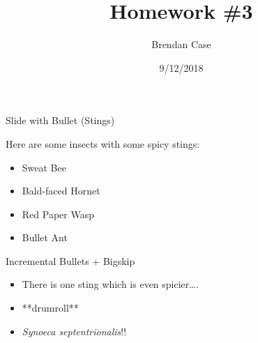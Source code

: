 \documentclass[ignorenonframetext,]{beamer}
\title{Homework \#3}
\author{Brendan Case}
\date{9/12/2018}
\providecommand{\tightlist}{%
  \setlength{\itemsep}{0pt}\setlength{\parskip}{0pt}}
\begin{document}
\frame{\titlepage}

\begin{frame}{Slide with Bullet (Stings)}
\protect\hypertarget{slide-with-bullet-stings}{}

Here are some insects with some spicy stings:

\begin{itemize}
\tightlist
\item
  \color{blue} Sweat Bee
\item
  \color{yellow} Bald-faced Hornet
\item
  \color{orange} Red Paper Wasp
\item
  \color{red} Bullet Ant
\end{itemize}

\end{frame}

\begin{frame}{Incremental Bullets + Bigskip}
\protect\hypertarget{incremental-bullets-bigskip}{}

\begin{itemize}[<+->]
\tightlist
\item
  There is one sting which is even spicier\ldots{}.
\item
  **drumroll** \bigskip \bigskip \bigskip \bigskip
\item
  \textit{Synoeca septentrionalis}!! 
\end{itemize}

\end{frame}
\end{document}
